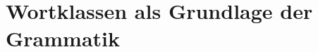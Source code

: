 \documentclass[handout,aspectratio=1610,dvipsnames]{beamer}
\begin{document}
  \section{Wortklassen als Grundlage der Grammatik}
  \let\woopsi\section\let\section\subsection\let\subsection\subsubsection
  
  \let\subsection\section\let\section\woopsi
  
\end{document}
